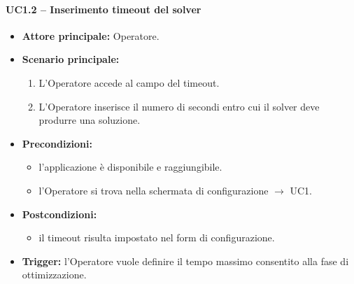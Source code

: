 \paragraph{UC1.2 -- Inserimento timeout del solver}
\begin{itemize}
    \item \textbf{Attore principale:} Operatore.
    \item \textbf{Scenario principale:}
    \begin{enumerate}
        \item L'Operatore accede al campo del timeout.
        \item L'Operatore inserisce il numero di secondi entro cui il solver deve produrre una soluzione.
    \end{enumerate}
    \item \textbf{Precondizioni:}
    \begin{itemize}
        \item l'applicazione è disponibile e raggiungibile.
        \item l'Operatore si trova nella schermata di configurazione $\rightarrow$ UC1.
    \end{itemize}
    \item \textbf{Postcondizioni:}
    \begin{itemize}
        \item il timeout risulta impostato nel form di configurazione.
    \end{itemize}
    \item \textbf{Trigger:} l'Operatore vuole definire il tempo massimo consentito alla fase di ottimizzazione.
\end{itemize}

